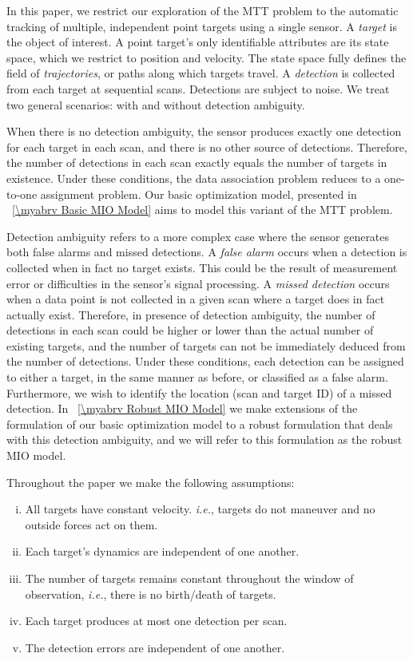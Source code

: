 In this paper, we restrict our exploration of the MTT problem to the automatic tracking of multiple, independent point targets using a single sensor. A \textit{target} is the object of interest. A point target's only identifiable attributes are its state space, which we restrict to position and velocity. The state space fully defines the field of \textit{trajectories}, or paths along which targets travel. A \textit{detection} is collected from each target at sequential scans. Detections are subject to noise. We treat two general scenarios: with and without detection ambiguity. 

When there is no detection ambiguity, the sensor produces exactly one detection for each target in each scan, and there is no other source of detections. Therefore, the number of detections in each scan exactly equals the number of targets in existence. Under these conditions, the data association problem reduces to a one-to-one assignment problem. Our basic optimization model, presented in \mysection~\ref{\myabrv Basic MIO Model} aims to model this variant of the MTT problem.

Detection ambiguity refers to a more complex case where the sensor generates both false alarms and missed detections. A \textit{false alarm} occurs when a detection is collected when in fact no target exists. This could be the result of measurement error or difficulties in the sensor's signal processing. A \textit{missed detection} occurs when a data point is not collected in a given scan where a target does in fact actually exist. Therefore, in presence of detection ambiguity, the number of detections in each scan could be higher or lower than the actual number of existing targets, and the number of targets can not be immediately deduced from the number of detections. Under these conditions, each detection can be assigned to either a target, in the same manner as before, or classified as a false alarm. Furthermore, we wish to identify the location (scan and target ID) of a missed detection. In \mysection~\ref{\myabrv Robust MIO Model} we make extensions of the formulation of our basic optimization model to a robust formulation that deals with this detection ambiguity, and we will refer to this formulation as the robust MIO model.

Throughout the paper we make the following assumptions:
\begin{assumption}\label{ass:general_assumption}
\leavevmode
\begin{enumerate}[(i)]
\item All targets have constant velocity. \textit{i.e.}, targets do not maneuver and no outside forces act on them.
\item Each target's dynamics are independent of one another.
\item The number of targets remains constant throughout the window of observation, \textit{i.e.}, there is no birth/death of targets.
\item Each target produces at most one detection per scan.
\item The detection errors are independent of one another.
\end{enumerate}
\end{assumption}

